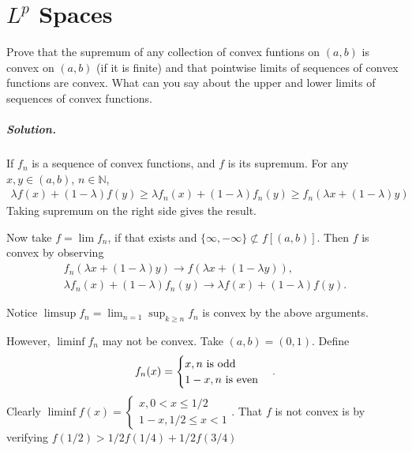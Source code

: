 \documentclass[../main.tex]{subfiles}
\begin{document}
  \chapter{$ L^p $ Spaces}
  \begin{exercise}
    Prove that the supremum of any collection of convex funtions on $ (a, b) $ is convex on $ (a, b) $ (if it is finite) and that pointwise limits of sequences of convex functions are convex. What can you say about the upper and lower limits of sequences of convex functions.
    \paragraph{Solution. }
    If $ f_n $ is a sequence of convex functions, and $ f $ is its supremum. For any $ x, y \in (a, b) $, $ n \in \mathbb{N} $,
    \begin{align*}
      \lambda f(x) + (1 - \lambda) f(y) \ge \lambda f_n(x) + (1 - \lambda) f_n(y) \ge f_n(\lambda x  + (1 - \lambda) y)
    \end{align*}
    Taking supremum on the right side gives the result.

    Now take $ f = \lim f_n $, if that exists and $ \{\infty, -\infty \} \not \subset f[(a, b)] $. Then $ f $ is convex by observing
    \begin{align*}
      f_n(\lambda x + (1 - \lambda) y) \to f(\lambda x + (1 - \lambda y)),\\
      \lambda f_n(x) + (1 - \lambda) f_n(y) \to \lambda f(x) + (1 - \lambda) f(y).
    \end{align*}

    Notice $ \limsup f_n = \lim _{n = 1} \sup _{k \ge n} f_n $ is convex by the above arguments.

    However, $ \liminf f_n $ may not be convex. Take $ (a, b) = (0, 1) $. Define
    \begin{align*}
      f_n (x) = \begin{cases}
        x, \text{$ n $ is odd}\\
        1 - x, \text{$ n $ is even}
    \end{cases}.
    \end{align*}
    Clearly $ \liminf f(x) = \begin{cases}
      x, 0 < x \le 1/2\\
      1 - x, 1/2 \le x < 1
    \end{cases}. $
    That $ f $ is not convex is by verifying $ f(1/2) > 1/2f(1/4) + 1/2f(3/4) $
  \end{exercise}
\end{document}
